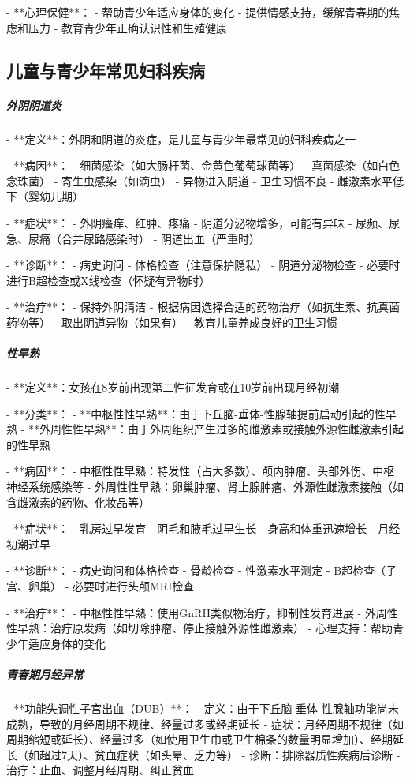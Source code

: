 \begin{enumerate}
- **心理保健**：
  - 帮助青少年适应身体的变化
  - 提供情感支持，缓解青春期的焦虑和压力
  - 教育青少年正确认识性和生殖健康

\subsection{儿童与青少年常见妇科疾病}

\subparagraph{外阴阴道炎}

- **定义**：外阴和阴道的炎症，是儿童与青少年最常见的妇科疾病之一

- **病因**：
  - 细菌感染（如大肠杆菌、金黄色葡萄球菌等）
  - 真菌感染（如白色念珠菌）
  - 寄生虫感染（如滴虫）
  - 异物进入阴道
  - 卫生习惯不良
  - 雌激素水平低下（婴幼儿期）

- **症状**：
  - 外阴瘙痒、红肿、疼痛
  - 阴道分泌物增多，可能有异味
  - 尿频、尿急、尿痛（合并尿路感染时）
  - 阴道出血（严重时）

- **诊断**：
  - 病史询问
  - 体格检查（注意保护隐私）
  - 阴道分泌物检查
  - 必要时进行B超检查或X线检查（怀疑有异物时）

- **治疗**：
  - 保持外阴清洁
  - 根据病因选择合适的药物治疗（如抗生素、抗真菌药物等）
  - 取出阴道异物（如果有）
  - 教育儿童养成良好的卫生习惯

\subparagraph{性早熟}

- **定义**：女孩在8岁前出现第二性征发育或在10岁前出现月经初潮

- **分类**：
  - **中枢性性早熟**：由于下丘脑-垂体-性腺轴提前启动引起的性早熟
  - **外周性性早熟**：由于外周组织产生过多的雌激素或接触外源性雌激素引起的性早熟

- **病因**：
  - 中枢性性早熟：特发性（占大多数）、颅内肿瘤、头部外伤、中枢神经系统感染等
  - 外周性性早熟：卵巢肿瘤、肾上腺肿瘤、外源性雌激素接触（如含雌激素的药物、化妆品等）

- **症状**：
  - 乳房过早发育
  - 阴毛和腋毛过早生长
  - 身高和体重迅速增长
  - 月经初潮过早

- **诊断**：
  - 病史询问和体格检查
  - 骨龄检查
  - 性激素水平测定
  - B超检查（子宫、卵巢）
  - 必要时进行头颅MRI检查

- **治疗**：
  - 中枢性性早熟：使用GnRH类似物治疗，抑制性发育进展
  - 外周性性早熟：治疗原发病（如切除肿瘤、停止接触外源性雌激素）
  - 心理支持：帮助青少年适应身体的变化

\subparagraph{青春期月经异常}

- **功能失调性子宫出血（DUB）**：
  - 定义：由于下丘脑-垂体-性腺轴功能尚未成熟，导致的月经周期不规律、经量过多或经期延长
  - 症状：月经周期不规律（如周期缩短或延长）、经量过多（如使用卫生巾或卫生棉条的数量明显增加）、经期延长（如超过7天）、贫血症状（如头晕、乏力等）
  - 诊断：排除器质性疾病后诊断
  - 治疗：止血、调整月经周期、纠正贫血


\end{enumerate}
